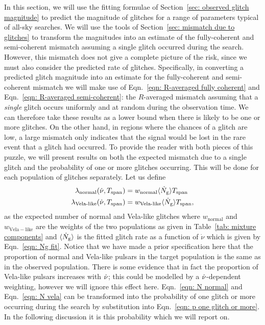 \documentclass[../full_thesis/full_thesis.tex]{subfiles}
\begin{document}
In this section, we will use the fitting formulae of Section~\ref{sec: observed glitch
magnitude} to predict the magnitude of glitches for a range of parameters
typical of all-sky searches. We will use the tools of Section~\ref{sec: mismatch
due to glitches} to transform the magnitudes into an estimate of the
fully-coherent and semi-coherent mismatch assuming a single glitch occurred
during the search. However, this mismatch does not give a complete picture of
the risk, since we must also consider the predicted rate of glitches.
Specifically, in converting a predicted glitch magnitude into an estimate for
the fully-coherent and semi-coherent mismatch we will make use of
Eqn.~\eqref{eqn: R-averaged fully coherent} and Eqn.~\eqref{eqn: R-averaged
semi-coherent}: the $R$-averaged mismatch assuming that a \emph{single} glitch
occurs uniformly and at random during the observation time. We can therefore
take these results as a lower bound when there is likely to be one or more
glitches. On the other hand, in regions where the chances of a glitch are low,
a large mismatch only indicates that the signal would be lost in the rare event
that a glitch had occurred. To provide the reader with both pieces of this
puzzle, we will present results on both the expected mismatch due to a single
glitch and the probability of one or more glitches occurring. This will be done
for each population of glitches separately. Let us define
\begin{align}
\lambda_{\textrm{normal}}(\dot{\nu}, T_{\mathrm{span}}) & = w_\textrm{normal}\langle \dot{N}_{\textrm{g}}\rangle T_{\mathrm{span}} 
\label{eqn: N normal}\\
\lambda_{\textrm{Vela-like}}(\dot{\nu}, T_{\mathrm{span}}) & = w_\textrm{Vela-like}\langle \dot{N}_{\textrm{g}}\rangle T_{\mathrm{span}},
\label{eqn: N vela}
\end{align}
as the expected number of normal and Vela-like glitches where
$w_\mathrm{normal}$ and $w_\mathrm{Vela-like}$ are the weights of the two
populations as given in Table~\ref{tab: mixture components} and $\langle \dot{N}_{\textrm{g}}\rangle$ is
the fitted glitch rate as a function of $\dot{\nu}$ which is given by
Eqn.~\eqref{eqn: Ng fit}. Notice that we have made a prior specification here
that the proportion of normal and Vela-like pulsars in the target population is
the same as in the observed population. There is some evidence that in fact the
proportion of Vela-like pulsars increases with $\dot{\nu}$; this could be
modelled by a $\dot{\nu}$-dependent weighting, however we will ignore this effect
here. Eqn.~\eqref{eqn: N normal} and Eqn.~\eqref{eqn: N vela} can be
transformed into the probability of one glitch or more occurring during the
search by substitution into Eqn.~\eqref{eqn: p one glitch or more}. In the
following discussion it is this probability which we will report on.
\end{document}
